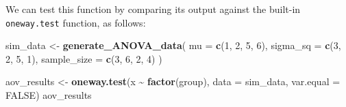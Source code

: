 \documentclass[
]{book}
\newenvironment{Shaded}{\begin{snugshade}}{\end{snugshade}}
\newcommand{\AttributeTok}[1]{\textcolor[rgb]{0.13,0.29,0.53}{#1}}
\newcommand{\ConstantTok}[1]{\textcolor[rgb]{0.56,0.35,0.01}{#1}}
\newcommand{\ControlFlowTok}[1]{\textcolor[rgb]{0.13,0.29,0.53}{\textbf{#1}}}
\newcommand{\DecValTok}[1]{\textcolor[rgb]{0.00,0.00,0.81}{#1}}
\newcommand{\FunctionTok}[1]{\textcolor[rgb]{0.13,0.29,0.53}{\textbf{#1}}}
\newcommand{\NormalTok}[1]{#1}
\newcommand{\OtherTok}[1]{\textcolor[rgb]{0.56,0.35,0.01}{#1}}
\newcommand{\SpecialCharTok}[1]{\textcolor[rgb]{0.81,0.36,0.00}{\textbf{#1}}}
\begin{document}
\begin{Shaded}
\end{Shaded}

We can test this function by comparing its output against the built-in \texttt{oneway.test} function, as follows:

\begin{Shaded}
\begin{Highlighting}[]
\NormalTok{sim\_data }\OtherTok{\textless{}{-}} \FunctionTok{generate\_ANOVA\_data}\NormalTok{(}
  \AttributeTok{mu =} \FunctionTok{c}\NormalTok{(}\DecValTok{1}\NormalTok{, }\DecValTok{2}\NormalTok{, }\DecValTok{5}\NormalTok{, }\DecValTok{6}\NormalTok{), }
  \AttributeTok{sigma\_sq =} \FunctionTok{c}\NormalTok{(}\DecValTok{3}\NormalTok{, }\DecValTok{2}\NormalTok{, }\DecValTok{5}\NormalTok{, }\DecValTok{1}\NormalTok{),}
  \AttributeTok{sample\_size =} \FunctionTok{c}\NormalTok{(}\DecValTok{3}\NormalTok{, }\DecValTok{6}\NormalTok{, }\DecValTok{2}\NormalTok{, }\DecValTok{4}\NormalTok{)}
\NormalTok{)}

\NormalTok{aov\_results }\OtherTok{\textless{}{-}} \FunctionTok{oneway.test}\NormalTok{(x }\SpecialCharTok{\textasciitilde{}} \FunctionTok{factor}\NormalTok{(group), }\AttributeTok{data =}\NormalTok{ sim\_data, }\AttributeTok{var.equal =} \ConstantTok{FALSE}\NormalTok{)}
\NormalTok{aov\_results}
\end{Highlighting}
\end{Shaded}
\end{document}
